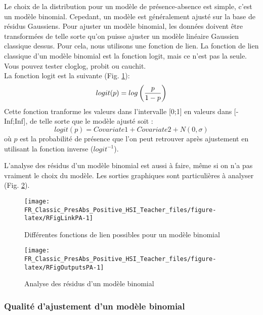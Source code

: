 \documentclass[french,a4paper]{article}
\begin{document}
Le choix de la distribution pour un modèle de présence-absence est simple, c'est un modèle binomial. Cepedant, un modèle est généralement ajusté sur la base de résidus Gaussiens. Pour ajuster un modèle binomial, les données doivent être transformées de telle sorte qu'on puisse ajuster un modèle linéaire Gaussien classique dessus. Pour cela, nous utilisons une fonction de lien. La fonction de lien classique d'un modèle binomial est la fonction logit, mais ce n'est pas la seule. Vous pouvez tester cloglog, probit ou cauchit.\\
La fonction logit est la suivante (Fig. \ref{fig:RFigLinkPA}):
\[logit(p) = log \left( p \over {1 - p}  \right)\]
Cette fonction tranforme les valeurs dans l'intervalle {[}0;1{]} en valeurs dans {[}-Inf;Inf{]}, de telle sorte que le modèle ajusté soit :
\[logit(p) = Covariate1 + Covariate2 + N(0, \sigma)\]
où \(p\) est la probabilité de présence que l'on peut retrouver après ajustement en utilisant la fonction inverse (\(logit^{-1}\)).



L'analyse des résidus d'un modèle binomial est aussi à faire, même si on n'a pas vraiment le choix du modèle. Les sorties graphiques sont particulières à analyser (Fig. \ref{fig:RFigOutputsPA}).



\begin{figure}[!h]

{\centering \texttt{[image: FR\_Classic\_PresAbs\_Positive\_HSI\_Teacher\_files/figure-latex/RFigLinkPA-1]} 

}

\caption{Différentes fonctions de lien possibles pour un modèle binomial}\label{fig:RFigLinkPA}
\end{figure}

\begin{figure}[!h]

{\centering \texttt{[image: FR\_Classic\_PresAbs\_Positive\_HSI\_Teacher\_files/figure-latex/RFigOutputsPA-1]} 

}

\caption{Analyse des résidus d'un modèle binomial}\label{fig:RFigOutputsPA}
\end{figure}

\hypertarget{qualite-dajustement-dun-modele-binomial}{%
\subsubsection{Qualité d'ajustement d'un modèle binomial}\label{qualite-dajustement-dun-modele-binomial}}
\end{document}
